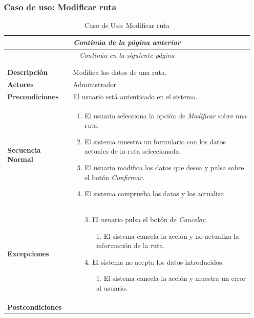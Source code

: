 \newpage
\subsubsection*{Caso de uso: Modificar ruta }
\begin{longtable}{| p{4cm} | p{10cm} |}
\endfirsthead
\multicolumn{2}{c}{\textit{Continúa de la página anterior}}\\[12pt]
\hline
\endhead
\hline
\multicolumn{2}{c}{\textit{Continúa en la siguiente página}} \\
\endfoot
\hline
\caption{Caso de Uso: Modificar ruta}\label{fig:1}\\
\endlastfoot


\hline
\multicolumn{2}{|c|}{\textbf{CU$<$28$>$ - Modificar Ruta}} \\

\hline
\textbf{Descripción} &
Modifica los datos de una ruta.\\

\hline
\textbf{Actores} &
Administrador\\

\hline
\textbf{Precondiciones} &
El usuario está autenticado en el sistema.\\

\hline
\textbf{Secuencia Normal} &\mbox{}\par\vspace{-\baselineskip}
\begin{enumerate}[leftmargin=0.7cm, topsep=0.1cm]
\item El usuario selecciona la opción de \textit{Modificar} sobre una ruta.
\item El sistema muestra un formulario con los datos actuales de la ruta seleccionada.
\item El usuario modifica los datos que desea y pulsa sobre el botón \textit{Confirmar}.
\item El sistema comprueba los datos y los actualiza.
\end{enumerate}


\\
\hline
\textbf{Excepciones} &\mbox{}\par\vspace{-\baselineskip}
\begin{enumerate}[leftmargin=0.9cm, topsep=0.1cm]
\item[3.] El usuario pulsa el botón de \textit{Cancelar}.
	\begin{itemize}
	\item[1.] El sistema cancela la acción y no actualiza la información de la ruta.
	\end{itemize}
\item[4.] El sistema no acepta los datos introducidos.
	\begin{itemize}
	\item[1.] El sistema cancela la acción y muestra un error al usuario.
	\end{itemize}
\end{enumerate}
\\

\hline
\textbf{Postcondiciones} & \\
\hline
\end{longtable}




